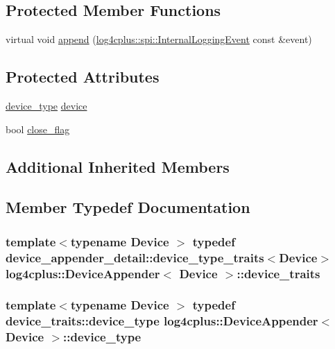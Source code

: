 \subsection*{Protected Member Functions}
\begin{DoxyCompactItemize}
\item 
virtual void \hyperlink{classlog4cplus_1_1DeviceAppender_a8010b1ebc0dd3deefe73138eac2868dc}{append} (\hyperlink{classlog4cplus_1_1spi_1_1InternalLoggingEvent}{log4cplus\-::spi\-::\-Internal\-Logging\-Event} const \&event)
\end{DoxyCompactItemize}
\subsection*{Protected Attributes}
\begin{DoxyCompactItemize}
\item 
\hyperlink{classlog4cplus_1_1DeviceAppender_a590c81a55f4366f846373b4f19559d06}{device\-\_\-type} \hyperlink{classlog4cplus_1_1DeviceAppender_a24c1cf2ab4b9718d12bcab4c10b55efa}{device}
\item 
bool \hyperlink{classlog4cplus_1_1DeviceAppender_a857d0eeeb46a5a18a77d7602cf98b86f}{close\-\_\-flag}
\end{DoxyCompactItemize}
\subsection*{Additional Inherited Members}


\subsection{Member Typedef Documentation}
\hypertarget{classlog4cplus_1_1DeviceAppender_a83e74702b437b83036b314068959c558}{
\subsubsection[{device\-\_\-traits}]{\setlength{\rightskip}{0pt plus 5cm}template$<$typename Device $>$ typedef {\bf device\-\_\-appender\-\_\-detail\-::device\-\_\-type\-\_\-traits}$<$Device$>$ {\bf log4cplus\-::\-Device\-Appender}$<$ Device $>$\-::{\bf device\-\_\-traits}}}\label{classlog4cplus_1_1DeviceAppender_a83e74702b437b83036b314068959c558}
\hypertarget{classlog4cplus_1_1DeviceAppender_a590c81a55f4366f846373b4f19559d06}{
\subsubsection[{device\-\_\-type}]{\setlength{\rightskip}{0pt plus 5cm}template$<$typename Device $>$ typedef {\bf device\-\_\-traits\-::device\-\_\-type} {\bf log4cplus\-::\-Device\-Appender}$<$ Device $>$\-::{\bf device\-\_\-type}}}\label{classlog4cplus_1_1DeviceAppender_a590c81a55f4366f846373b4f19559d06}


